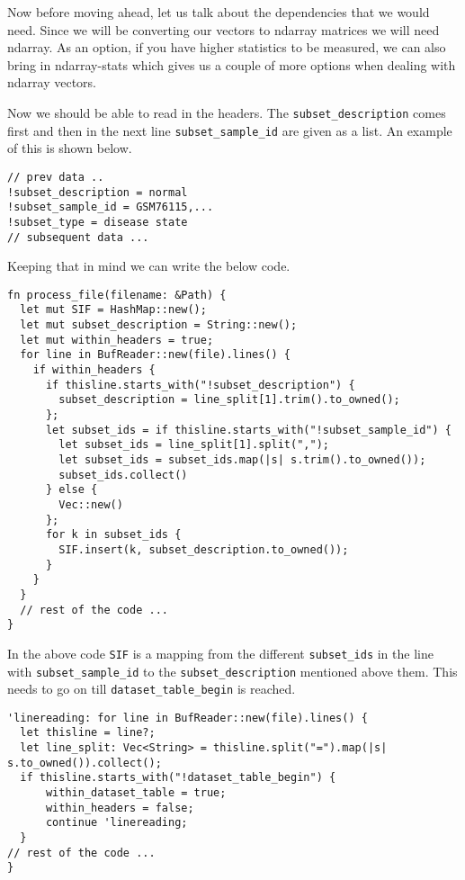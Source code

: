 \documentclass{book}
\begin{document}
Now before moving ahead, let us talk about the dependencies that we would need. Since we will be converting our vectors to ndarray matrices we will need ndarray. As an option, if you have higher statistics to be measured, we can also bring in ndarray-stats which gives us a couple of more options when dealing with ndarray vectors.

Now we should be able to read in the headers. The \lstinline{subset_description} comes first and then in the next line \lstinline{subset_sample_id} are given as a list. An example of this is shown below.

\begin{lstlisting}[caption={}, basicstyle=\small]
// prev data ..
!subset_description = normal
!subset_sample_id = GSM76115,...
!subset_type = disease state
// subsequent data ...
\end{lstlisting}

Keeping that in mind we can write the below code.

\begin{lstlisting}[caption={chapter7/statistics/src/main.rs}, basicstyle=\small]
fn process_file(filename: &Path) {
  let mut SIF = HashMap::new();
  let mut subset_description = String::new();
  let mut within_headers = true;
  for line in BufReader::new(file).lines() {
    if within_headers {
      if thisline.starts_with("!subset_description") {
        subset_description = line_split[1].trim().to_owned();
      };
      let subset_ids = if thisline.starts_with("!subset_sample_id") {
        let subset_ids = line_split[1].split(",");
        let subset_ids = subset_ids.map(|s| s.trim().to_owned());
        subset_ids.collect()
      } else {
        Vec::new()
      };
      for k in subset_ids {
        SIF.insert(k, subset_description.to_owned());
      }
    }
  }
  // rest of the code ...
}
\end{lstlisting}

In the above code \lstinline{SIF} is a mapping from the different \lstinline{subset_ids} in the line with \lstinline{subset_sample_id} to the \lstinline{subset_description} mentioned above them. This needs to go on till \lstinline{dataset_table_begin} is reached.

\begin{lstlisting}[caption={chapter7/statistics/src/main.rs}, basicstyle=\small]
'linereading: for line in BufReader::new(file).lines() {
  let thisline = line?;
  let line_split: Vec<String> = thisline.split("=").map(|s| s.to_owned()).collect();
  if thisline.starts_with("!dataset_table_begin") {
      within_dataset_table = true;
      within_headers = false;
      continue 'linereading;
  }
// rest of the code ...
}
\end{lstlisting}
\end{document}
